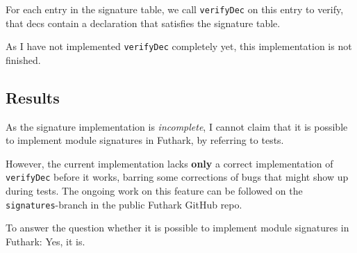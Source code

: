 For each entry in the signature table, we call \texttt{verifyDec} on this entry to
verify, that decs contain a declaration that satisfies the signature table.

As I have not implemented \texttt{verifyDec} completely yet, this implementation
is not finished.

\subsection{Results}
As the signature implementation is \textit{incomplete}, I cannot claim that it
is possible to implement module signatures in Futhark, by referring to tests.

However, the current implementation lacks \textbf{only} a correct implementation of
\texttt{verifyDec} before it works, barring some corrections of bugs that might
show up during tests.
The ongoing work on this feature can be followed on the \texttt{signatures}-branch in
the public Futhark GitHub repo.

To answer the question whether it is possible to implement module signatures in
Futhark: Yes, it is. 
